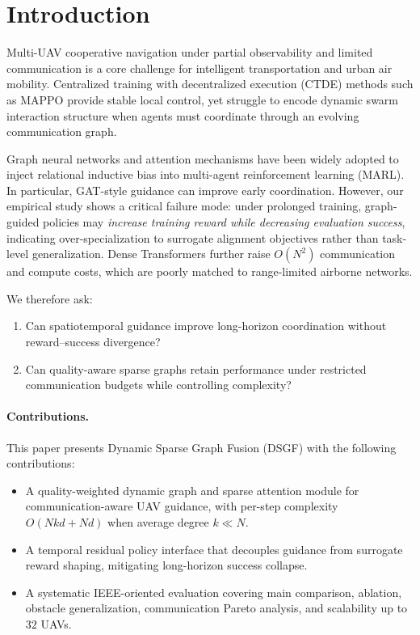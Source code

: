 
\section{Introduction}
\label{sec:intro}

Multi-UAV cooperative navigation under partial observability and limited
communication is a core challenge for intelligent transportation and
urban air mobility.
Centralized training with decentralized execution (CTDE) methods such as MAPPO
provide stable local control, yet struggle to encode dynamic swarm interaction
structure when agents must coordinate through an evolving communication graph.

Graph neural networks and attention mechanisms have been widely adopted to
inject relational inductive bias into multi-agent reinforcement learning
(MARL).
In particular, GAT-style guidance can improve early coordination.
However, our empirical study shows a critical failure mode:
under prolonged training, graph-guided policies may \emph{increase training
reward while decreasing evaluation success}, indicating over-specialization to
surrogate alignment objectives rather than task-level generalization.
Dense Transformers further raise $O(N^{2})$ communication and compute costs,
which are poorly matched to range-limited airborne networks.

We therefore ask:
\begin{enumerate}
  \item Can spatiotemporal guidance improve long-horizon coordination without
        reward--success divergence?
  \item Can quality-aware sparse graphs retain performance under restricted
        communication budgets while controlling complexity?
\end{enumerate}

\paragraph{Contributions.}
This paper presents Dynamic Sparse Graph Fusion (DSGF) with the following
contributions:
\begin{itemize}
  \item A quality-weighted dynamic graph and sparse attention module for
        communication-aware UAV guidance, with per-step complexity
        $O(Nkd+Nd)$ when average degree $k\ll N$.
  \item A temporal residual policy interface that decouples guidance from
        surrogate reward shaping, mitigating long-horizon success collapse.
  \item A systematic IEEE-oriented evaluation covering main comparison,
        ablation, obstacle generalization, communication Pareto analysis, and
        scalability up to $32$ UAVs.
\end{itemize}

